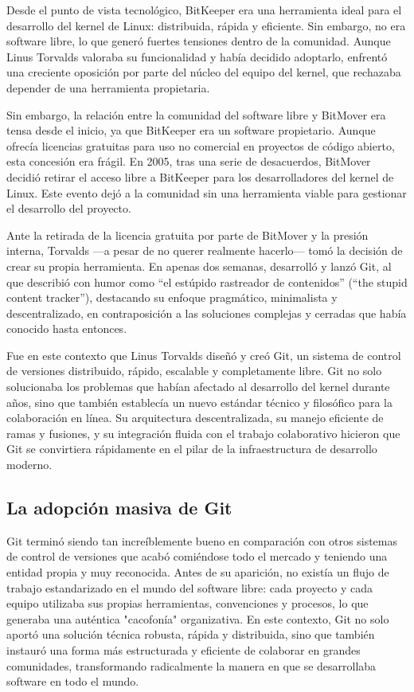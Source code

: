 \documentclass[a4paper,12pt]{article}
\begin{document}
Desde el punto de vista tecnológico, BitKeeper era una herramienta ideal para el
desarrollo del kernel de Linux: distribuida, rápida y eficiente. Sin embargo, no
era software libre, lo que generó fuertes tensiones dentro de la comunidad.
Aunque Linus Torvalds valoraba su funcionalidad y había decidido adoptarlo,
enfrentó una creciente oposición por parte del núcleo del equipo del kernel, que
rechazaba depender de una herramienta propietaria.

Sin embargo, la relación entre la comunidad del software libre y BitMover era
tensa desde el inicio, ya que BitKeeper era un software propietario. Aunque
ofrecía licencias gratuitas para uso no comercial en proyectos de código
abierto, esta concesión era frágil. En 2005, tras una serie de desacuerdos,
BitMover decidió retirar el acceso libre a BitKeeper para los desarrolladores
del kernel de Linux. Este evento dejó a la comunidad sin una herramienta viable
para gestionar el desarrollo del proyecto.

Ante la retirada de la licencia gratuita por parte de BitMover y la presión
interna, Torvalds —a pesar de no querer realmente hacerlo— tomó la decisión de
crear su propia herramienta. En apenas dos semanas, desarrolló y lanzó Git, al
que describió con humor como “el estúpido rastreador de contenidos” (“the stupid
content tracker”), destacando su enfoque pragmático, minimalista y
descentralizado, en contraposición a las soluciones complejas y cerradas que
había conocido hasta entonces.

Fue en este contexto que Linus Torvalds diseñó y creó Git, un sistema de control
de versiones distribuido, rápido, escalable y completamente libre. Git no solo
solucionaba los problemas que habían afectado al desarrollo del kernel durante
años, sino que también establecía un nuevo estándar técnico y filosófico para la
colaboración en línea. Su arquitectura descentralizada, su manejo eficiente de
ramas y fusiones, y su integración fluida con el trabajo colaborativo hicieron
que Git se convirtiera rápidamente en el pilar de la infraestructura de
desarrollo moderno.


\subsection{La adopción masiva de Git}

Git terminó siendo tan increíblemente bueno en comparación con otros sistemas de control de
versiones que acabó comiéndose todo el mercado y teniendo una entidad propia y
muy reconocida. Antes de su aparición, no existía un flujo de trabajo
estandarizado en el mundo del software libre: cada proyecto y cada equipo
utilizaba sus propias herramientas, convenciones y procesos, lo que generaba una
auténtica "cacofonía" organizativa. En este contexto, Git no solo aportó una
solución técnica robusta, rápida y distribuida, sino que también instauró una
forma más estructurada y eficiente de colaborar en grandes comunidades,
transformando radicalmente la manera en que se desarrollaba software en todo el
mundo.
\end{document}

